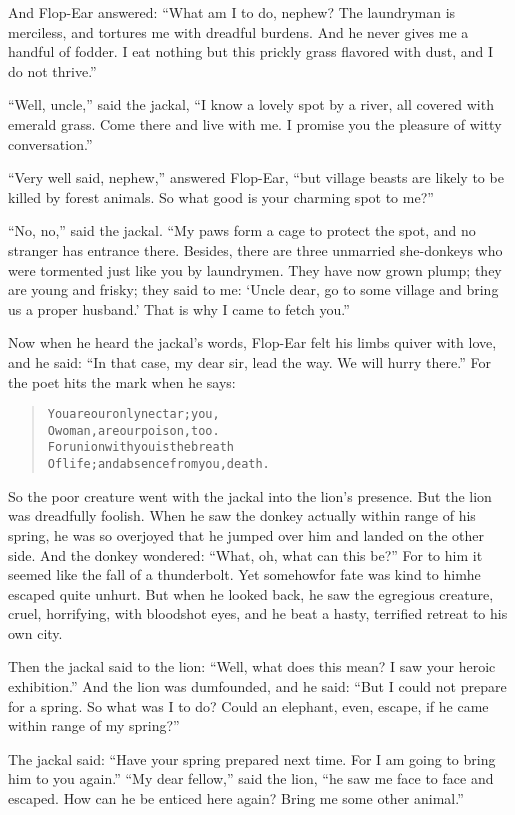 \documentclass[article, twoside, 14pt]{memoir}
\renewenvironment{verbatim}{%
\begin{quote}%
\vskip -10pt%
\begin{alltt}\normalfont\large}{\end{alltt}%
\end{quote}%
\vskip -10pt
} %
\begin{document}
And Flop-Ear answered:
``What am I to do, nephew? The laundryman is merciless, and tortures me with dreadful burdens. And he never gives me a handful of fodder. I eat nothing but this prickly grass flavored with dust, and I do not thrive.''

``Well, uncle,'' said the jackal,
``I know a lovely spot by a river, all covered with emerald grass. Come there and live with me. I promise you the pleasure of witty conversation.''

``Very well said, nephew,'' answered Flop-Ear,
``but village beasts are likely to be killed by forest animals. So what good is your charming spot to me?''

``No, no,'' said the jackal.
``My paws form a cage to protect the spot, and no stranger has entrance there. Besides, there are three unmarried she-donkeys who were tormented just like you by laundrymen. They have now grown plump; they are young and frisky; they said to me: `Uncle dear, go to some village and bring us a proper husband.' That is why I came to fetch you.''

Now when he heard the jackal's words, Flop-Ear felt his limbs
quiver with love, and he said:
``In that case, my dear sir, lead the way. We will hurry there.''
For the poet hits the mark when he says:

\begin{verbatim}
You are our only nectar; you,
O woman, are our poison, too.
For union with you is the breath
Of life; and absence from you, death.
\end{verbatim}
So the poor creature went with the jackal into the lion's presence.
But the lion was dreadfully foolish. When he saw the donkey
actually within range of his spring, he was so overjoyed that he
jumped over him and landed on the other side. And the donkey
wondered: ``What, oh, what can this be?'' For to him it seemed like
the fall of a thunderbolt. Yet somehow{\textemdash}for fate was kind to
him{\textemdash}he escaped quite unhurt. But when he looked back, he saw the
egregious creature, cruel, horrifying, with bloodshot eyes, and he
beat a hasty, terrified retreat to his own city.

Then the jackal said to the lion:
``Well, what does this mean? I saw your heroic exhibition.'' And
the lion was dumfounded, and he said:
``But I could not prepare for a spring. So what was I to do? Could an elephant, even, escape, if he came within range of my spring?''

The jackal said:
``Have your spring prepared next time. For I am going to bring him to you again.''
``My dear fellow,'' said the lion,
``he saw me face to face and escaped. How can he be enticed here again? Bring me some other animal.''
\end{document}
